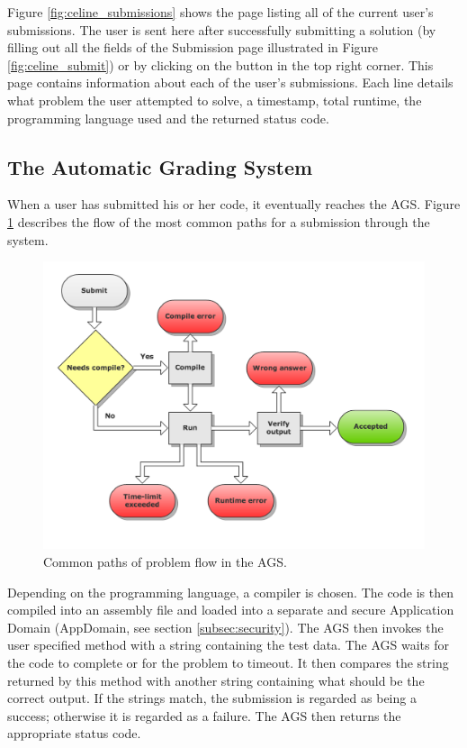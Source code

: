 Figure \ref{fig:celine_submissions} shows the page listing all of the current user's submissions. The user is sent here after successfully submitting a solution (by filling out all the fields of the Submission page illustrated in Figure \ref{fig:celine_submit}) or by clicking on the button in the top right corner. This page contains information about each of the user's submissions. Each line details what problem the user attempted to solve, a timestamp, total runtime, the programming language used and the returned status code. 


\subsection{The Automatic Grading System}
When a user has submitted his or her code, it eventually reaches the AGS. Figure \ref{fig:flowchart} describes the flow of the most common paths for a submission through the system.

\begin{figure}[h]
	\centering
	\includegraphics[width=0.8\linewidth]{chapters/media/flowchart.png}
	\caption{Common paths of problem flow in the AGS.}
	\label{fig:flowchart}
\end{figure}

Depending on the programming language, a compiler is chosen. The code is then compiled into an assembly file and loaded into a separate and secure Application Domain (AppDomain, see section \ref{subsec:security}). The AGS then invokes the user specified method with a string containing the test data. The AGS waits for the code to complete or for the problem to timeout. It then compares the string returned by this method with another string containing what should be the correct output. If the strings match, the submission is regarded as being a success; otherwise it is regarded as a failure. The AGS then returns the appropriate status code. 


